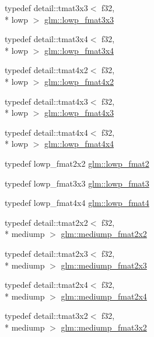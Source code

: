 \begin{DoxyCompactItemize}
\item 
typedef detail\-::tmat3x3$<$ f32, \\*
lowp $>$ \hyperlink{group__gtc__type__precision_ga25b389b52269f3256f015b4fff5789c2}{glm\-::lowp\-\_\-fmat3x3}
\item 
typedef detail\-::tmat3x4$<$ f32, \\*
lowp $>$ \hyperlink{group__gtc__type__precision_ga366a3249a72ddc76fb3ee4f2379cf3fb}{glm\-::lowp\-\_\-fmat3x4}
\item 
typedef detail\-::tmat4x2$<$ f32, \\*
lowp $>$ \hyperlink{group__gtc__type__precision_ga2433f92674e42eb6a75384fbab262306}{glm\-::lowp\-\_\-fmat4x2}
\item 
typedef detail\-::tmat4x3$<$ f32, \\*
lowp $>$ \hyperlink{group__gtc__type__precision_gaa4df4f3adcc8eb3bed680b14a87fb2c4}{glm\-::lowp\-\_\-fmat4x3}
\item 
typedef detail\-::tmat4x4$<$ f32, \\*
lowp $>$ \hyperlink{group__gtc__type__precision_ga9ff955b170643f547661d2e7263ee426}{glm\-::lowp\-\_\-fmat4x4}
\item 
typedef lowp\-\_\-fmat2x2 \hyperlink{group__gtc__type__precision_ga9bafb192cb7327d543ad55be2e6e675c}{glm\-::lowp\-\_\-fmat2}
\item 
typedef lowp\-\_\-fmat3x3 \hyperlink{group__gtc__type__precision_ga88ae00cab6aae48d56700915c7799973}{glm\-::lowp\-\_\-fmat3}
\item 
typedef lowp\-\_\-fmat4x4 \hyperlink{group__gtc__type__precision_ga00dfb85ec53bb5f173747f73d13c1b8b}{glm\-::lowp\-\_\-fmat4}
\item 
typedef detail\-::tmat2x2$<$ f32, \\*
mediump $>$ \hyperlink{group__gtc__type__precision_gae9af1d96efbaeeb5c5edd9c7b0a24fa5}{glm\-::mediump\-\_\-fmat2x2}
\item 
typedef detail\-::tmat2x3$<$ f32, \\*
mediump $>$ \hyperlink{group__gtc__type__precision_gaae7081e19f495e7cdbf727e1550b95a8}{glm\-::mediump\-\_\-fmat2x3}
\item 
typedef detail\-::tmat2x4$<$ f32, \\*
mediump $>$ \hyperlink{group__gtc__type__precision_ga8f793d90a5a6bea23c13ad195fcb5de2}{glm\-::mediump\-\_\-fmat2x4}
\item 
typedef detail\-::tmat3x2$<$ f32, \\*
mediump $>$ \hyperlink{group__gtc__type__precision_ga40681f25413b8705b16da2f534692f59}{glm\-::mediump\-\_\-fmat3x2}

\end{DoxyCompactItemize}
